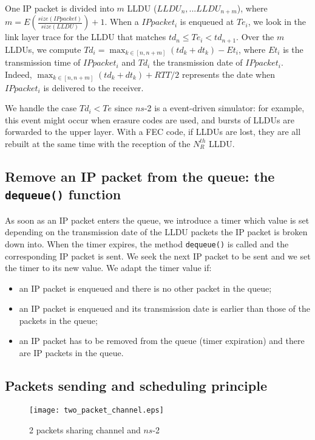 \documentclass[conference,letterpaper]{IEEEtran}
\begin{document}
One IP packet is divided into $m$ LLDU ($LLDU_n, ... LLDU_{n+m}$), where $m=E ( {\frac{size(IP packet)}{size(LLDU)}} ) +1$. When a $IP packet_i$ is enqueued at $Te_i$, we look in the link layer trace for the LLDU that matches $td_n \leqslant Te_i<td_{n+1}$. Over the $m$ LLDUs, we compute $Td_i=\max_{k \in [n, n+m]}(td_k+dt_k)-Et_i$, where $Et_i$ is the transmission time of $IP packet_i$ and $Td_i$ the transmission date of $IP packet_i$. Indeed, $\max_{k \in [n, n+m]} (td_k+dt_k)+RTT/2$ represents the date when $IP packet_i$ is delivered to the receiver. 

We handle the case $Td_i<Te$ since $ns$-2 is a event-driven simulator: for example, this event might occur when erasure codes are used, and bursts of LLDUs are forwarded to the upper layer. With a FEC code, if LLDUs are lost, they are all rebuilt at the same time with the reception of the $N_R^{th}$ LLDU. 

\subsection{Remove an IP packet from the queue: the \texttt{dequeue()} function}
\label{subsec::n2_deque}

As soon as an IP packet enters the queue, we introduce a timer which value is set depending on the transmission date of the LLDU packets the IP packet is broken down into. When the timer expires, the method \texttt{dequeue()} is called and the corresponding IP packet is sent. We seek the next IP packet to be sent and we set the timer to its new value. 
We adapt the timer value if:  
\begin{itemize}
\item an IP packet is enqueued and there is no other packet in the queue;
\item an IP packet is enqueued and its transmission date is earlier than those of the packets in the queue;
\item an IP packet has to be removed from the queue (timer expiration) and there are IP packets in the queue.
\end{itemize}

\subsection{Packets sending and scheduling principle}
\label{subsec::n2_scheduling}

\begin{figure}[h]
    \begin{center}
	\texttt{[image: two\_packet\_channel.eps]}
	\caption{2 packets sharing channel and $ns$-2}
	\label{fig::two_packet_channel}
    \end{center}
\end{figure}
\end{document}
